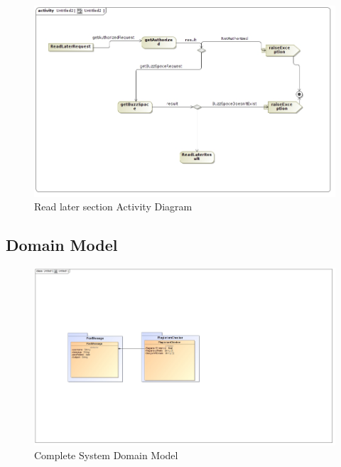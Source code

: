 \documentclass[11pt]{article}
\begin{document}
	\begin{figure}[H]	
\graphicspath{ {../Diagrams/sfiso/} }
    	\includegraphics[scale=0.5]{readA.jpg}
    	\caption{Read later section Activity Diagram}
	\end{figure}




\subsection{Domain Model}
\graphicspath{ {../Diagrams/} }
	  \begin{figure}[H]	
    	\includegraphics[scale=0.32]{Domain.jpg}
    	\caption{Complete System Domain Model}
	\end{figure}
\end{document}
